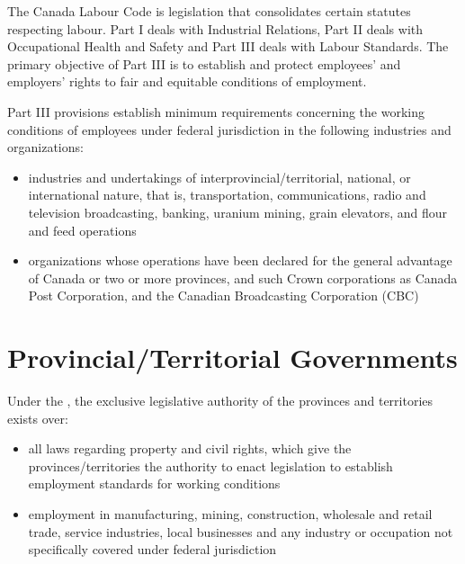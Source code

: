 \documentclass[letterpaper,10pt,english]{sphinxmanual}
\begin{document}
\sphinxAtStartPar
The Canada Labour Code is legislation that consolidates certain statutes respecting labour.
Part I deals with Industrial Relations, Part II deals with Occupational Health and Safety and
Part III deals with Labour Standards. The primary objective of Part III is to establish and
protect employees’ and employers’ rights to fair and equitable conditions of employment.

\sphinxAtStartPar
Part III provisions establish minimum requirements concerning the working conditions of
employees under federal jurisdiction in the following industries and organizations:
\begin{itemize}
\item {} 
\sphinxAtStartPar
industries and undertakings of inter\sphinxhyphen{}provincial/territorial, national, or international nature, that is, transportation, communications, radio and television broadcasting, banking, uranium mining, grain elevators, and flour and feed operations

\item {} 
\sphinxAtStartPar
organizations whose operations have been declared for the general advantage of Canada or two or more provinces, and such Crown corporations as Canada Post Corporation, and the Canadian Broadcasting Corporation (CBC)

\end{itemize}


\section{Provincial/Territorial Governments}
\label{\detokenize{1_introduction:provincial-territorial-governments}}
\sphinxAtStartPar
Under the , the exclusive legislative authority of the provinces and
territories exists over:
\begin{itemize}
\item {} 
\sphinxAtStartPar
all laws regarding property and civil rights, which give the provinces/territories the authority to enact legislation to establish employment standards for working conditions

\item {} 
\sphinxAtStartPar
employment in manufacturing, mining, construction, wholesale and retail trade, service industries, local businesses and any industry or occupation not specifically covered under federal jurisdiction

\end{itemize}
\end{document}

